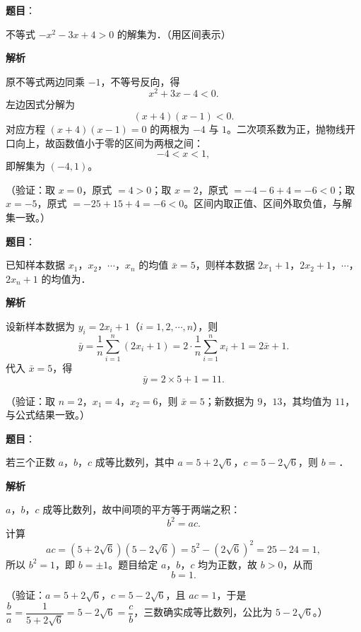 \begin{answer}

\textbf{题目}：

不等式 \(-x^2-3x+4>0\) 的解集为\gkblank{}．（用区间表示）

\textbf{解析}

原不等式两边同乘 \(-1\)，不等号反向，得
\nopagebreak[4]
\[
x^2+3x-4<0.
\]
左边因式分解为
\nopagebreak[4]
\[
(x+4)(x-1)<0.
\]
对应方程 \((x+4)(x-1)=0\) 的两根为 \(-4\) 与 \(1\)。二次项系数为正，抛物线开口向上，故函数值小于零的区间为两根之间：
\nopagebreak[4]
\[
-4<x<1,
\]
即解集为 \((-4,1)\)。

（验证：取 \(x=0\)，原式 \(=4>0\)；取 \(x=2\)，原式 \(=-4-6+4=-6<0\)；取 \(x=-5\)，原式 \(=-25+15+4=-6<0\)。区间内取正值、区间外取负值，与解集一致。）


\end{answer}
\begin{answer}

\textbf{题目}：

已知样本数据 \(x_1\)，\(x_2\)，\(\cdots\)，\(x_n\) 的均值 \(\bar{x}=5\)，则样本数据 \(2x_1+1\)，\(2x_2+1\)，\(\cdots\)，\(2x_n+1\) 的均值为\gkblank{}．

\textbf{解析}

设新样本数据为 \(y_i=2x_i+1\)（\(i=1,2,\cdots,n\)），则
\nopagebreak[4]
\[
\bar{y}=\dfrac{1}{n}\sum_{i=1}^{n}(2x_i+1)
=2\cdot\dfrac{1}{n}\sum_{i=1}^{n}x_i+1
=2\bar{x}+1.
\]
代入 \(\bar{x}=5\)，得
\nopagebreak[4]
\[
\bar{y}=2\times5+1=11.
\]

（验证：取 \(n=2\)，\(x_1=4\)，\(x_2=6\)，则 \(\bar{x}=5\)；新数据为 \(9\)，\(13\)，其均值为 \(11\)，与公式结果一致。）


\end{answer}
\begin{answer}

\textbf{题目}：

若三个正数 \(a\)，\(b\)，\(c\) 成等比数列，其中 \(a=5+2\sqrt{6}\)，\(c=5-2\sqrt{6}\)，则 \(b=\)\gkblank{}．

\textbf{解析}

\(a\)，\(b\)，\(c\) 成等比数列，故中间项的平方等于两端之积：
\nopagebreak[4]
\[
b^2=ac.
\]
计算
\nopagebreak[4]
\[
ac=(5+2\sqrt6)(5-2\sqrt6)=5^2-(2\sqrt6)^2=25-24=1,
\]
所以 \(b^2=1\)，即 \(b=\pm1\)。题目给定 \(a\)，\(b\)，\(c\) 均为正数，故 \(b>0\)，从而
\nopagebreak[4]
\[
b=1.
\]

（验证：\(a=5+2\sqrt6\)，\(c=5-2\sqrt6\)，且 \(ac=1\)，于是 \(\dfrac{b}{a}=\dfrac{1}{5+2\sqrt6}=5-2\sqrt6=\dfrac{c}{b}\)，三数确实成等比数列，公比为 \(5-2\sqrt6\)。）


\end{answer}
